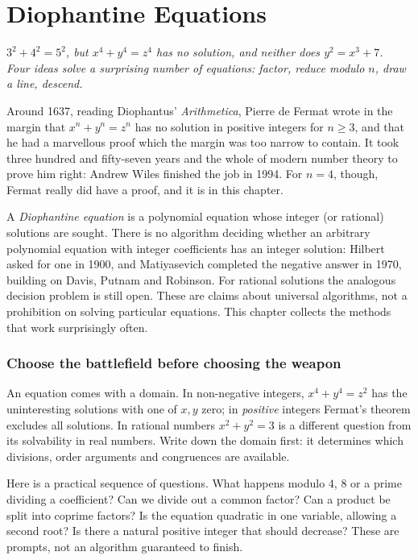 \chapter{Diophantine Equations}\label{ch:diophantine}

\begin{center}\itshape
$3^2+4^2=5^2$, but $x^4+y^4=z^4$ has no solution, and neither does $y^2=x^3+7$.\\
Four ideas solve a surprising number of equations: factor, reduce modulo $n$, draw a line, descend.
\end{center}

Around 1637, reading Diophantus' \emph{Arithmetica}, Pierre de Fermat wrote in the margin that $x^n+y^n=z^n$ has no solution in positive integers for $n\ge3$,
and that he had a marvellous proof which the margin was too narrow to contain. It took three hundred and fifty-seven years and the whole of modern number
theory to prove him right: Andrew Wiles finished the job in 1994. For $n=4$, though, Fermat really did have a proof, and it is in this chapter.

A \emph{Diophantine equation} is a polynomial equation whose integer (or rational) solutions are sought. There is no algorithm deciding whether an arbitrary polynomial equation with integer coefficients has an integer solution: Hilbert asked for one in 1900, and Matiyasevich completed the negative answer in 1970, building on Davis, Putnam and Robinson. For rational solutions the analogous decision problem is still open. These are claims about universal algorithms, not a prohibition on solving particular equations. This chapter collects the methods that work surprisingly often.

\subsection*{Choose the battlefield before choosing the weapon}
An equation comes with a domain. In non-negative integers, $x^4+y^4=z^2$ has the uninteresting solutions with one of $x,y$ zero; in \emph{positive} integers Fermat's theorem excludes all solutions. In rational numbers $x^2+y^2=3$ is a different question from its solvability in real numbers. Write down the domain first: it determines which divisions, order arguments and congruences are available.

Here is a practical sequence of questions. What happens modulo $4$, $8$ or a prime dividing a coefficient? Can we divide out a common factor? Can a product be split into coprime factors? Is the equation quadratic in one variable, allowing a second root? Is there a natural positive integer that should decrease? These are prompts, not an algorithm guaranteed to finish.

